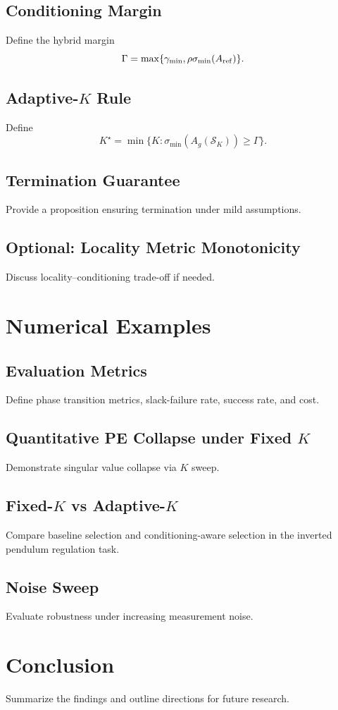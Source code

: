 \documentclass{article}
\theoremstyle{definition}
\begin{document}
\subsection{Conditioning Margin}
Define the hybrid margin
\[
\Gamma = \max\{\gamma_{\min}, \rho \sigma_{\min}(A_{\rm ref})\}.
\]

\subsection{Adaptive-$K$ Rule}
Define
\[
K^\star = \min \{K : \sigma_{\min}(A_g(\mathcal{S}_K)) \ge \Gamma \}.
\]

\subsection{Termination Guarantee}
Provide a proposition ensuring termination under mild assumptions.

\subsection{Optional: Locality Metric Monotonicity}
Discuss locality--conditioning trade-off if needed.



\section{Numerical Examples}

\subsection{Evaluation Metrics}
Define phase transition metrics, slack-failure rate, success rate, and cost.

\subsection{Quantitative PE Collapse under Fixed $K$}
Demonstrate singular value collapse via $K$ sweep.

\subsection{Fixed-$K$ vs Adaptive-$K$}
Compare baseline selection and conditioning-aware selection 
in the inverted pendulum regulation task.

\subsection{Noise Sweep}
Evaluate robustness under increasing measurement noise.



\section{Conclusion}

Summarize the findings and outline directions for future research.
\end{document}
